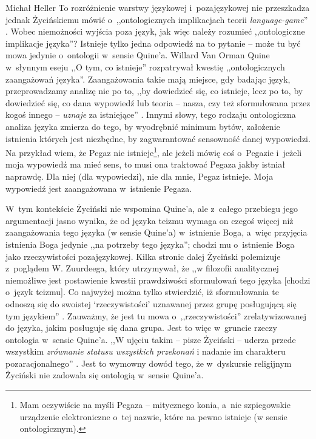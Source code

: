 \begin{artplenv}{Michał Heller}
To rozróżnienie warstwy językowej i~pozajęzykowej nie przeszkadza jednak Życińskiemu mówić o~,,ontologicznych implikacjach teorii \textit{language-game}''
\parencite[][s.~18]{zycinski_teizm_1985}. %
 Wobec niemożności wyjścia poza język, jak więc należy rozumieć ,,ontologiczne implikacje języka''? Istnieje tylko jedna odpowiedź na to pytanie -- może tu być mowa jedynie o~ontologii w~sensie Quine'a. Willard Van Orman Quine w~słynnym eseju ,,O tym, co istnieje'' 
\parencite[][]{quine_o_1969} %
 rozpatrywał kwestię ,,ontologicznych zaangażowań języka''. Zaangażowania takie mają miejsce, gdy badając język, przeprowadzamy analizę nie po to, ,,by dowiedzieć się, co istnieje, lecz po to, by dowiedzieć się, co dana wypowiedź lub teoria -- nasza, czy też sformułowana przez kogoś innego -- \textit{uznaje} za istniejące''
\parencite[][s.~29]{quine_o_1969}. %
 Innymi słowy, tego rodzaju ontologiczna analiza języka zmierza do tego, by wyodrębnić minimum bytów, założenie istnienia których jest niezbędne, by zagwarantować sensowność danej wypowiedzi. Na przykład wiem, że Pegaz nie istnieje\footnote{Mam oczywiście na myśli Pegaza -- mitycznego konia, a~nie szpiegowskie urządzenie elektroniczne o~tej nazwie, które na pewno istnieje (w sensie ontologicznym).}, ale jeżeli mówię coś o~Pegazie i~jeżeli moja wypowiedź ma mieć sens, to musi ona traktować Pegaza jakby istniał naprawdę. Dla niej (dla wypowiedzi), nie dla mnie, Pegaz istnieje. Moja wypowiedź jest zaangażowana w~istnienie Pegaza.

W~tym kontekście Życiński nie wspomina Quine'a, ale z~całego przebiegu jego argumentacji jasno wynika, że od języka teizmu wymaga on czegoś więcej niż zaangażowania tego języka (w sensie Quine'a) w~istnienie Boga, a~więc przyjęcia istnienia Boga jedynie ,,na potrzeby tego języka''; chodzi mu o~istnienie Boga jako rzeczywistości pozajęzykowej. Kilka stronic dalej Życiński polemizuje z~poglądem W. Zuurdeega, który utrzymywał, że ,,w filozofii analitycznej niemożliwe jest postawienie kwestii prawdziwości sformułowań tego języka [chodzi o~język teizmu]. Co najwyżej można tylko stwierdzić, iż sformułowania te odnoszą się do swoistej ‘rzeczywistości' uznawanej przez grupę posługującą się tym językiem''
\parencite[][s.~28]{zycinski_teizm_1985}. %
 Zauważmy, że jest tu mowa o~,,rzeczywistości'' zrelatywizowanej do języka, jakim posługuje się dana grupa. Jest to więc w~gruncie rzeczy ontologia w~sensie Quine'a. ,,W ujęciu takim -- pisze Życiński -- uderza przede wszystkim \textit{zrównanie statusu wszystkich przekonań} i nadanie im charakteru pozaracjonalnego'' 
\parencite[][s.~28]{zycinski_teizm_1985}. %
 Jest to wymowny dowód tego, że w~dyskursie religijnym Życiński nie zadowala się ontologią w~sensie Quine'a.


\end{artplenv}
